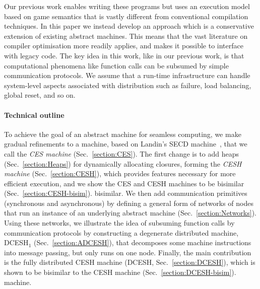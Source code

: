 \documentclass{article}
\theoremstyle{definition}
\newcommand{\DCESHi}{DCESH$_1$}
\newcommand{\DCESHn}{DCESH}
\begin{document}
Our previous work enables writing these programs but uses an execution model
based on game semantics that is vastly different from conventional compilation
techniques.  In this paper we instead develop an approach which is a conservative
extension of existing abstract machines. This means that the vast literature on
compiler optimisation more readily applies, and makes it possible to interface
with legacy code.  The key idea in this work, like in our previous work, is
that computational phenomena like function calls can be subsumed by simple
communication protocols. We assume that a run-time infrastructure can handle
system-level aspects associated with distribution such as failure, load
balancing, global reset, and so on.

\paragraph*{Technical outline}
To achieve the goal of an abstract machine for seamless computing, we make
gradual refinements to a machine, based on Landin's SECD
machine~\cite{Landin64}, that we call the \emph{CES machine}
(Sec.~\ref{section:CES}). The first change is to add heaps 
\iffullversion 
(Sec.~\ref{section:Heaps})
\fi
for dynamically allocating closures, forming the \emph{CESH machine}
(Sec.~\ref{section:CESH}), which provides features necessary for more efficient
execution, and we show the CES and CESH machines to be
\iffullversion
bisimilar (Sec.~\ref{section:CESH-bisim}).
\else
bisimilar.
\fi
We then add communication primitives (synchronous and asynchronous) by defining
a general form of networks of nodes that run an instance of an underlying abstract
machine (Sec.~\ref{section:Networks}).  Using these networks, we illustrate the
idea of subsuming function calls by communication protocols by constructing a
degenerate distributed machine, \DCESHi{} (Sec.~\ref{section:ADCESH}), that decomposes
some machine instructions into message passing, but only runs on one node.
Finally, the main contribution is the fully distributed CESH machine (\DCESHn{}, Sec.~\ref{section:DCESH}), which is shown to be bisimilar to the CESH
\iffullversion
machine (Sec.~\ref{section:DCESH-bisim}).
\else
machine.
\fi
\end{document}
